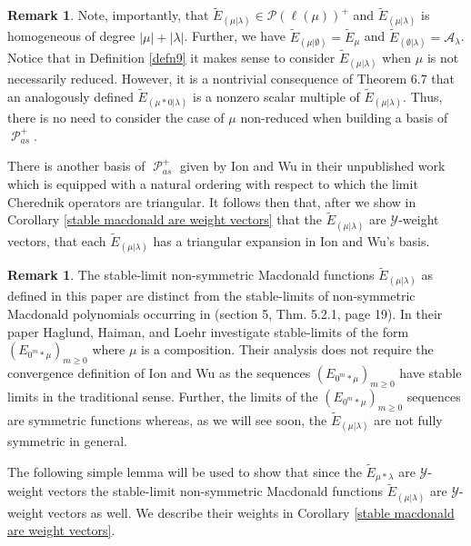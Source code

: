 \documentclass[11pt]{article}
\theoremstyle{definition}
\newtheorem{rema}[theo]{Remark}
\numberwithin{equation}{section}
\newcommand{\y}{{ \mathscr{Y} }}
\DeclareMathOperator{\sP}{\mathscr{P} }
\begin{document}
\begin{rema}
     Note, importantly, that $\widetilde{E}_{(\mu|\lambda)} \in \mathscr{P}(\ell(\mu))^{+}$ and $\widetilde{E}_{(\mu|\lambda)}$ is homogeneous of degree $|\mu| + |\lambda|$. Further, we have $\widetilde{E}_{(\mu|\emptyset)} = \widetilde{E}_{\mu}  $ and $\widetilde{E}_{(\emptyset |\lambda)} = \mathcal{A}_{\lambda}$. Notice that in Definition \ref{defn9} it makes sense to consider $\widetilde{E}_{(\mu|\lambda)}$ when $\mu$ is not necessarily reduced. However, it is a nontrivial consequence of Theorem 6.7 that an analogously defined $\widetilde{E}_{(\mu*0|\lambda)}$ is a nonzero scalar multiple of $\widetilde{E}_{(\mu|\lambda)}.$ Thus, there is no need to consider the case of $\mu$ non-reduced when building a basis of $\sP_{as}^{+}.$

     There is another basis of $\sP_{as}^{+}$ given by Ion and Wu in their unpublished work \cite{IW_2022} which is equipped with a natural ordering with respect to which the limit Cherednik operators are triangular. It follows then that, after we show in Corollary \ref{stable macdonald are weight vectors} that the $\widetilde{E}_{(\mu|\lambda)}$ are $\y$-weight vectors, that each $\widetilde{E}_{(\mu|\lambda)}$ has a triangular expansion in Ion and Wu's basis.
\end{rema}

\begin{rema}
    The stable-limit non-symmetric Macdonald functions $\widetilde{E}_{(\mu|\lambda)}$ as defined in this paper are distinct from the stable-limits of non-symmetric Macdonald polynomials occurring in \cite{haglund2007combinatorial} (section 5, Thm. 5.2.1, page 19). In their paper Haglund, Haiman, and Loehr investigate stable-limits of the form $(E_{0^m* \mu})_{m \geq 0}$ where $\mu$ is a composition. Their analysis does not require the convergence definition of Ion and Wu as the sequences $(E_{0^m* \mu})_{m \geq 0}$ have stable limits in the traditional sense. Further, the limits of the $(E_{0^m* \mu})_{m \geq 0}$ sequences are symmetric functions whereas, as we will see soon, the $\widetilde{E}_{(\mu|\lambda)}$ are not fully symmetric in general. 
\end{rema}

The following simple lemma will be used to show that since the $\widetilde{E}_{\mu*\lambda}$ are $\y$-weight vectors the stable-limit non-symmetric Macdonald functions $\widetilde{E}_{(\mu|\lambda)}$ are $\y$-weight vectors as well. We describe their weights in Corollary \ref{stable macdonald are weight vectors}.
\end{document}
